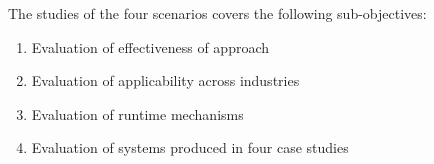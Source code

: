 The studies of the four scenarios covers the following sub-objectives:

\begin{enumerate}
	\item Evaluation of effectiveness of approach
	\item Evaluation of applicability across industries
	\item Evaluation of runtime mechanisms
	\item Evaluation of systems produced in four case studies
\end{enumerate}